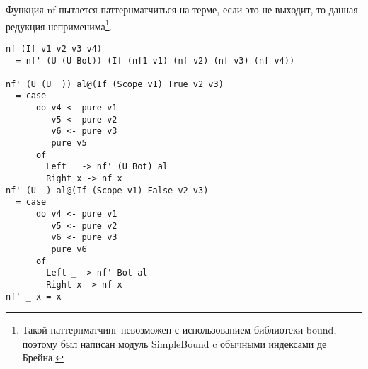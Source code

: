 Функция nf пытается паттернматчиться на терме, если это не выходит, то данная редукция неприменима\footnote{Такой паттернматчинг невозможен с использованием библиотеки bound\cite{bound}, поэтому был написан модуль SimpleBound c обычными индексами де Брейна.}.

\begin{lstlisting}[caption={Приведение в нормальную форму пытается применить все редукции данного функционального символа},captionpos=b, frame=single]
nf (If v1 v2 v3 v4)
  = nf' (U (U Bot)) (If (nf1 v1) (nf v2) (nf v3) (nf v4))

nf' (U (U _)) al@(If (Scope v1) True v2 v3)
  = case
      do v4 <- pure v1
         v5 <- pure v2
         v6 <- pure v3
         pure v5
      of
        Left _ -> nf' (U Bot) al
        Right x -> nf x
nf' (U _) al@(If (Scope v1) False v2 v3)
  = case
      do v4 <- pure v1
         v5 <- pure v2
         v6 <- pure v3
         pure v6
      of
        Left _ -> nf' Bot al
        Right x -> nf x
nf' _ x = x
\end{lstlisting}
